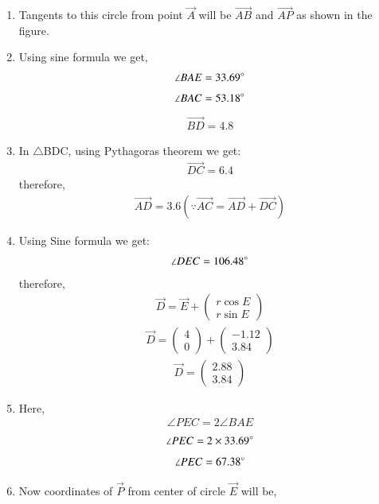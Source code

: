 \documentclass[journal,12pt,twocolumn]{IEEEtran}
\newcommand{\myvec}[1]{\ensuremath{\begin{pmatrix}#1\end{pmatrix}}}
\begin{document}
\begin{enumerate}
    \item Tangents to this circle from point $\vec{A}$ will be $\vec{AB}$ and $\vec{AP}$ as shown in the figure.\\
    \item Using sine formula we get,
    \begin{align}
    \angle BAE=33.69\degree
    \end{align}
    \begin{align}
        \angle BAC=53.18\degree
    \end{align}
    \begin{align}
       \vec{BD}= 4.8
    \end{align}
    \item In $\triangle$BDC, using Pythagoras theorem we get:
    \begin{align}
        \vec{DC}= 6.4
    \end{align}
    therefore, \begin{align}
    \vec{AD}= 3.6 (\because \vec{AC}= \vec{AD}+\vec{DC})
    \end{align}
    \item Using Sine formula we get:
    \begin{align}
        \angle DEC=106.48\degree
    \end{align}
    therefore, \begin{align}
        \vec{D}= \vec{E}+\myvec{r\cos E\\r\sin E}
    \end{align}
    \begin{align}
        \vec{D}=\myvec{4\\0}+\myvec{-1.12\\3.84}
    \end{align}
    \begin{align}
        \vec{D}=\myvec{2.88\\3.84}
    \end{align}
\item Here,
\begin{align}
\angle PEC= 2\angle BAE
\end{align}
\begin{align}
    \angle PEC=2\times 33.69\degree
\end{align}
\begin{align}
    \angle PEC= 67.38\degree
\end{align}
\item Now coordinates of $\vec{P}$ from center of circle $\vec{E}$ will be,
\begin{align}

\end{align}
\end{enumerate}
\end{document}
